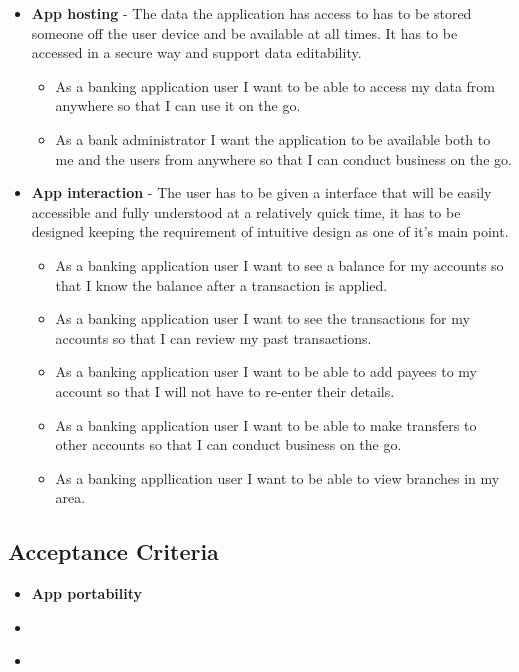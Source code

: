 \begin{itemize}
    \item  \textbf{App hosting} - The data the application has access to has to be stored someone off the user device and be available at all times. It has to be accessed in a secure way and support data editability.
        \begin{itemize}
        \item As a banking application user I want to be able to access my data from anywhere so that I can use it on the go.
        \item As a bank administrator I want the application to be available both to me and the users from anywhere so that I can conduct business on the go.
        \end{itemize}
    \item  \textbf{App interaction} - The user has to be given a interface that will be easily accessible and fully understood at a relatively quick time, it has to be designed keeping the requirement of intuitive design as one of it's main point.
        \begin{itemize}
        \item As a banking application user I want to see a balance for my accounts so that I know the balance after a transaction is applied. \cite{userStories}
        \item As a banking application user I want to see the transactions for my accounts so that I can review my past transactions.
        \item As a banking application user I want to be able to add payees to my account so that I will not have to re-enter their details.
        \item As a banking application user I want to be able to make transfers to other accounts so that I can conduct business on the go.
        \item As a banking appllication user I want to be able to view branches in my area.
        \end{itemize}
    \end{itemize}
    \subsection{Acceptance Criteria}
    \begin{itemize}
    \item  \textbf{App portability}
    \item  \textbf{}
    \item  \textbf{}
    \end{itemize}
